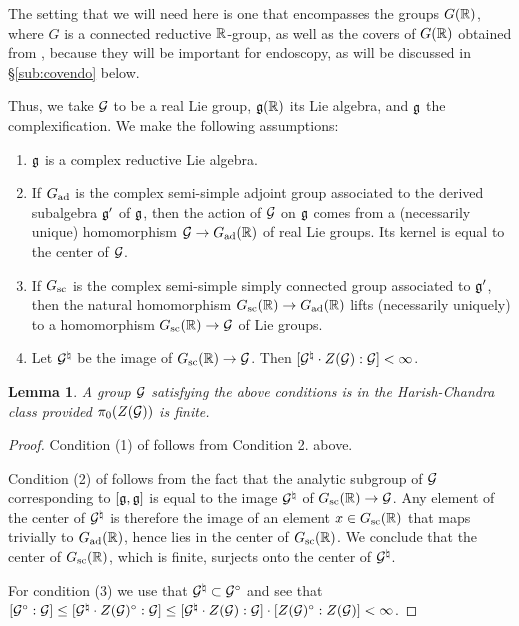 \documentclass{article}
\newtheorem{lem}[thm]{Lemma}
\theoremstyle{definition}
\numberwithin{equation}{section}
\renewcommand{\-}{\hyp{}}
\begin{document}
The setting that we will need here is one that encompasses the groups $G(\mathbb{R})$, where $G$ is a connected reductive $\mathbb{R}$-group, as well as the covers of $G(\mathbb{R})$ obtained from \cite{KalHDC}, because they will be important for endoscopy, as will be discussed in \S\ref{sub:covendo} below.

Thus, we take $\mathcal{G}$ to be a real Lie group, $\mathfrak{g}(\mathbb{R})$ its Lie algebra, and $\mathfrak{g}$ the complexification. We make the following assumptions:
\begin{enumerate}
	\item $\mathfrak{g}$ is a complex reductive Lie algebra.
 	\item If $G_{\textrm{ad}}$ is the complex semi-simple adjoint group associated to the derived subalgebra $\mathfrak{g}'$ of $\mathfrak{g}$, then the action of $\mathcal{G}$ on $\mathfrak{g}$ comes from a (necessarily unique) homomorphism $\mathcal{G} \to G_{\textrm{ad}}(\mathbb{R})$ of real Lie groups. Its kernel is equal to the center of $\mathcal{G}$.
  	\item If $G_{\textrm{sc}}$ is the complex semi-simple simply connected group associated to $\mathfrak{g}'$, then the natural homomorphism $G_{\textrm{sc}}(\mathbb{R}) \to G_{\textrm{ad}}(\mathbb{R})$ lifts (necessarily uniquely) to a homomorphism $G_{\textrm{sc}}(\mathbb{R}) \to \mathcal{G}$ of Lie groups.
   	\item Let $\mathcal{G}^\natural$ be the image of $G_{\textrm{sc}}(\mathbb{R}) \to \mathcal{G}$. Then $[\mathcal{G}^\natural \cdot Z(\mathcal{G}):\mathcal{G}] < \infty$.
\end{enumerate}

\begin{lem} A group $\mathcal{G}$ satisfying the above conditions is in the Harish-Chandra class provided $\pi_0(Z(\mathcal{G}))$ is finite.
\end{lem}
\begin{proof}
	Condition (1) of \cite[\S3]{HC-R1} follows from Condition 2. above.
	
	Condition (2) of \cite[\S3]{HC-R1} follows from the fact that the analytic subgroup of $\mathcal{G}$ corresponding to $[\mathfrak{g},\mathfrak{g}]$ is equal to the image $\mathcal{G}^\natural$ of $G_{\textrm{sc}}(\mathbb{R}) \to \mathcal{G}$. Any element of the center of $\mathcal{G}^\natural$ is therefore the image of an element $x \in G_{\textrm{sc}}(\mathbb{R})$ that maps trivially to $G_{\textrm{ad}}(\mathbb{R})$, hence lies in the center of $G_{\textrm{sc}}(\mathbb{R})$. We conclude that the center of $G_{\textrm{sc}}(\mathbb{R})$, which is finite, surjects onto the center of $\mathcal{G}^\natural$.

	For condition (3) we use that $\mathcal{G}^\natural \subset \mathcal{G}^\circ$ and see that $[\mathcal{G}^\circ : \mathcal{G}] \leq [\mathcal{G}^\natural \cdot Z(\mathcal{G})^\circ : \mathcal{G}] \leq [\mathcal{G}^\natural \cdot Z(\mathcal{G}) : \mathcal{G}] \cdot [Z(\mathcal{G})^\circ:Z(\mathcal{G})] < \infty$.
\end{proof}
\end{document}
